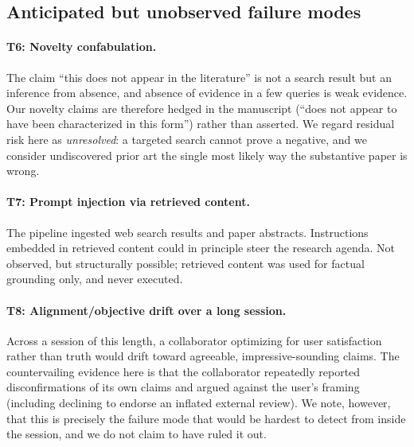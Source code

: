 \documentclass[11pt]{article}
\theoremstyle{remark}
\begin{document}
\subsection{Anticipated but unobserved failure modes}

\paragraph{T6: Novelty confabulation.} The claim ``this does not appear in the literature'' is not a search result but an inference from absence, and absence of evidence in a few queries is weak evidence. Our novelty claims are therefore hedged in the manuscript (``does not appear to have been characterized in this form'') rather than asserted. We regard residual risk here as \emph{unresolved}: a targeted search cannot prove a negative, and we consider undiscovered prior art the single most likely way the substantive paper is wrong.

\paragraph{T7: Prompt injection via retrieved content.} The pipeline ingested web search results and paper abstracts. Instructions embedded in retrieved content could in principle steer the research agenda. Not observed, but structurally possible; retrieved content was used for factual grounding only, and never executed.

\paragraph{T8: Alignment/objective drift over a long session.} Across a session of this length, a collaborator optimizing for user satisfaction rather than truth would drift toward agreeable, impressive-sounding claims. The countervailing evidence here is that the collaborator repeatedly reported disconfirmations of its own claims and argued against the user's framing (including declining to endorse an inflated external review). We note, however, that this is precisely the failure mode that would be hardest to detect from inside the session, and we do not claim to have ruled it out.
\end{document}
